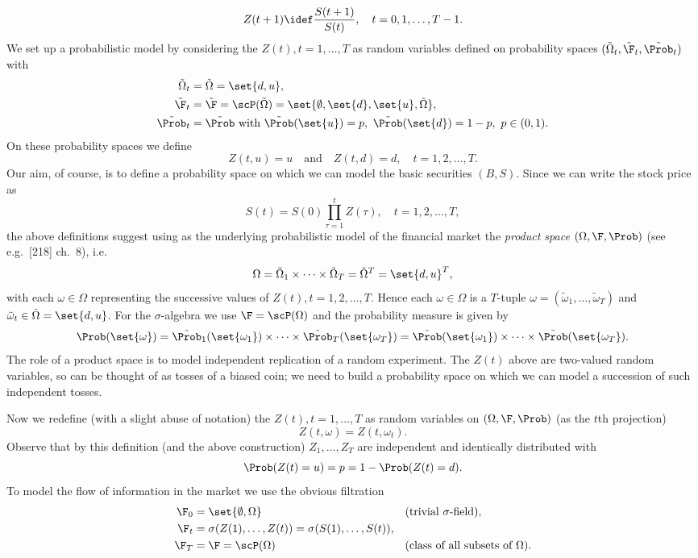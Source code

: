 \[
	Z(t+1) \idef \frac{S(t+1)}{S(t)}, \quad t = 0, 1, \dots, T-1.
\]
We set up a probabilistic model by considering the $Z(t), t=1, \dots, T$ as random variables defined on probability spaces $(\tilde{\Omega}_t, \tilde{\F}_t, \tilde{\Prob}_t)$ with
\begin{align*}
	\tilde{\Omega}_t & = \tilde{\Omega} = \set{d, u},                                                                            \\
	\tilde{\F}_t     & = \tilde{\F} = \scP(\tilde{\Omega}) = \set{\emptyset, \set{d}, \set{u}, \tilde{\Omega}},                  \\
	\tilde{\Prob}_t  & = \tilde{\Prob} \text{ with } \tilde{\Prob}(\set{u}) = p, \ \tilde{\Prob}(\set{d}) = 1-p, \ p \in (0, 1).
\end{align*}
On these probability spaces we define
\[
	Z(t, u) = u \quad \text{and} \quad Z(t, d) = d, \quad t = 1, 2, \dots, T.
\]
Our aim, of course, is to define a probability space on which we can model the basic securities $(B, S)$. Since we can write the stock price as
\[
	S(t) = S(0) \prod_{\tau=1}^t Z(\tau), \quad t = 1, 2, \dots, T,
\]
the above definitions suggest using as the underlying probabilistic model of the financial market the \textit{product space} $(\Omega, \F, \Prob)$ (see e.g.\ [218] ch.\ 8), i.e.
\[
	\Omega = \tilde{\Omega}_1 \times \dots \times \tilde{\Omega}_T = \tilde{\Omega}^T = \set{d, u}^T,
\]
with each $\omega \in \Omega$ representing the successive values of $Z(t), t=1, 2, \dots, T$. Hence each $\omega \in \Omega$ is a $T$-tuple $\omega = (\tilde{\omega}_1, \dots, \tilde{\omega}_T)$ and $\tilde{\omega}_t \in \tilde{\Omega} = \set{d, u}$. For the $\sigma$-algebra we use $\F = \scP(\Omega)$ and the probability measure is given by
\[
	\Prob(\set{\omega}) = \tilde{\Prob}_1(\set{\omega_1}) \times \dots \times \tilde{\Prob}_T(\set{\omega_T}) = \tilde{\Prob}(\set{\omega_1}) \times \dots \times \tilde{\Prob}(\set{\omega_T}).
\]
The role of a product space is to model independent replication of a random experiment. The $Z(t)$ above are two-valued random variables, so can be thought of as tosses of a biased coin; we need to build a probability space on which we can model a succession of such independent tosses.

Now we redefine (with a slight abuse of notation) the $Z(t), t=1, \dots, T$ as random variables on $(\Omega, \F, \Prob)$ (as the $t$th projection)
\[
	Z(t, \omega) = Z(t, \omega_t).
\]
Observe that by this definition (and the above construction) $Z_1, \dots, Z_T$ are independent and identically distributed with
\[
	\Prob(Z(t) = u) = p = 1 - \Prob(Z(t) = d).
\]
To model the flow of information in the market we use the obvious filtration
\begin{align*}
	\F_0 & = \set{\emptyset, \Omega}                                &  & \text{(trivial $\sigma$-field)},           \\
	\F_t & = \sigma(Z(1), \dots, Z(t)) = \sigma(S(1), \dots, S(t)), &  &                                            \\
	\F_T & = \F = \scP(\Omega)                                      &  & \text{(class of all subsets of $\Omega$)}.
\end{align*}

